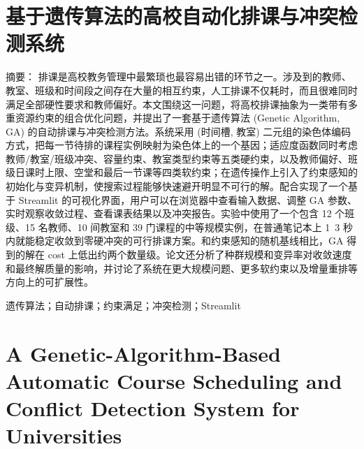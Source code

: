 \setcounter{page}{1}
\pagestyle{body}
\hspace*{\fill}
\section*{\heiti
基于遗传算法的高校自动化排课与冲突检测系统}

\noindent
{\heiti
摘要：}
排课是高校教务管理中最繁琐也最容易出错的环节之一。涉及到的教师、教室、班级和时间段之间存在大量的相互约束，人工排课不仅耗时，而且很难同时满足全部硬性要求和教师偏好。本文围绕这一问题，将高校排课抽象为一类带有多重资源约束的组合优化问题，并提出了一套基于遗传算法 (Genetic Algorithm, GA) 的自动排课与冲突检测方法。系统采用 (时间槽, 教室) 二元组的染色体编码方式，把每一节待排的课程实例映射为染色体上的一个基因；适应度函数同时考虑教师/教室/班级冲突、容量约束、教室类型约束等五类硬约束，以及教师偏好、班级日课时上限、空堂和最后一节课等四类软约束；在遗传操作上引入了约束感知的初始化与变异机制，使搜索过程能够快速避开明显不可行的解。配合实现了一个基于 Streamlit 的可视化界面，用户可以在浏览器中查看输入数据、调整 GA 参数、实时观察收敛过程、查看课表结果以及冲突报告。实验中使用了一个包含 12 个班级、15 名教师、10 间教室和 39 门课程的中等规模实例，在普通笔记本上 1~3 秒内就能稳定收敛到零硬冲突的可行排课方案。和约束感知的随机基线相比，GA 得到的解在 cost 上低出约两个数量级。论文还分析了种群规模和变异率对收敛速度和最终解质量的影响，并讨论了系统在更大规模问题、更多软约束以及增量重排等方向上的可扩展性。

遗传算法；自动排课；约束满足；冲突检测；Streamlit

\clearpage
\hspace*{\fill}
\section*{
A Genetic-Algorithm-Based Automatic Course Scheduling and Conflict Detection System for Universities}


